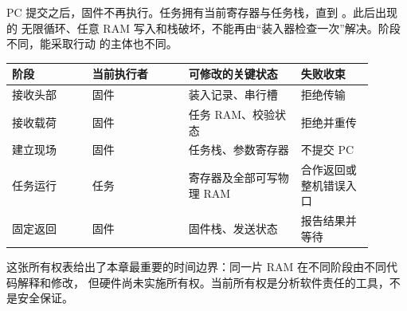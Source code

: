 PC 提交之后，固件不再执行。任务拥有当前寄存器与任务栈，直到 。此后出现的
无限循环、任意 RAM 写入和栈破坏，不能再由“装入器检查一次”解决。阶段不同，能采取行动
的主体也不同。

\begin{longtable}{|L{0.20\linewidth}|L{0.24\linewidth}|L{0.28\linewidth}|L{0.18\linewidth}|}
\hline
阶段 & 当前执行者 & 可修改的关键状态 & 失败收束 \\ \hline
接收头部 & 固件 & 装入记录、串行槽 & 拒绝传输 \\ \hline
接收载荷 & 固件 & 任务 RAM、校验状态 & 拒绝并重传 \\ \hline
建立现场 & 固件 & 任务栈、参数寄存器 & 不提交 PC \\ \hline
任务运行 & 任务 & 寄存器及全部可写物理 RAM & 合作返回或整机错误入口 \\ \hline
固定返回 & 固件 & 固件栈、发送状态 & 报告结果并等待 \\ \hline
\end{longtable}

这张所有权表给出了本章最重要的时间边界：同一片 RAM 在不同阶段由不同代码解释和修改，
但硬件尚未实施所有权。当前所有权是分析软件责任的工具，不是安全保证。

